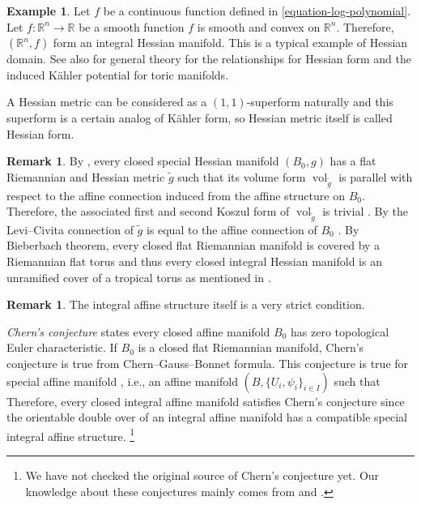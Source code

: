 \documentclass[a4paper,dvipdfmx,reqno,12pt]{amsart}
\makeatletter
\newcommand{\ind}[2]{\emph{#1}\index{1{#2}@{#1}}}
\theoremstyle{definition}
\newtheorem{example}[theorem]{Example}
\newtheorem{remark}[theorem]{Remark}
\newcommand{\opn}[1]{\operatorname{#1}}
\newcommand{\myfootnote}[1]{\hspace{-5pt}\footnote{#1}}
\numberwithin{equation}{section}
\makeatother
\begin{document}
\begin{example}
Let $f$ be a continuous function defined in 
\cref{equation-log-polynomial}.
Let $f\colon \mathbb{R}^{n}\to \mathbb{R}$ be 
a smooth function 
$f$ is smooth and convex 
on $\mathbb{R}^{n}$.
Therefore, $(\mathbb{R}^{n},f)$ form an integral 
Hessian manifold. This is a typical example of
Hessian domain.
See also \cite[Appendix 2]{MR1301331} for general theory for
the relationships for Hessian form and the induced K\"{a}hler potential for
toric manifolds.
\end{example}

A Hessian metric can be considered as a $(1,1)$-superform 
naturally and this superform is a certain analog of 
K\"ahler form, so Hessian metric itself is called Hessian form.

\begin{remark} \label{remark-compact-hessian}
By \cite[Theorem 2.1, Corollary 2.3]{MR714338},
every closed special Hessian manifold $(B_0,g)$ has 
a flat Riemannian and Hessian metric $\tilde{g}$ such 
that its volume form $\opn{vol}_{\tilde{g}}$ is parallel 
with respect to the
affine connection induced from the affine structure 
on $B_0$.
Therefore, the associated first and second Koszul 
form of $\opn{vol}_{\tilde{g}}$ is trivial 
\cite[Definition 3.1.2]{MR2293045}.
By \cite[Theorem 8.3.3]{MR2293045}
the Levi--Civita connection of $\tilde{g}$ is 
equal to the affine connection of $B_0$ 
\cite[Corollary 8.3.7]{MR2293045}. 
By Bieberbach theorem, every closed flat Riemannian manifold 
is covered by a Riemannian flat torus and thus every closed 
integral Hessian manifold is an unramified cover of 
a tropical torus as mentioned in \cite[5.2]{MR1882331}.
\end{remark}

\begin{remark}
The integral affine structure itself is a very strict condition.

\ind{Chern's conjecture}{Chern's conjecture} states 
every closed affine manifold $B_0$ has zero topological 
Euler characteristic.
If $B_0$ is a closed flat Riemannian manifold, Chern's conjecture is true from Chern--Gauss--Bonnet formula.
This conjecture is true for special affine manifold \cite{MR3665000}
, i.e., an affine manifold $(B, \{U_i,\psi_i\}_{i\in I})$ such that 
$ $
Therefore, every closed integral affine manifold satisfies Chern's conjecture since the orientable double over of an integral affine manifold has a compatible special integral affine structure.
\myfootnote{We have not checked 
the original source of Chern's conjecture yet.
Our knowledge about these conjectures
mainly comes from \cite{goldmanRadianceObstructionParallel1984a}
and \cite{MR3665000}.
}
\end{remark}
\end{document}

